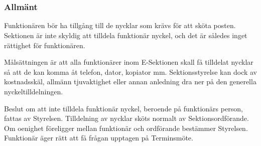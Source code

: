 \documentclass[10pt]{article}
\begin{document}
\section*{\doctitle}

\subsubsection*{Allmänt}

Funktionären bör ha tillgång till de nycklar som krävs för att sköta posten. Sektionen är inte skyldig att tilldela funktionär nyckel, och det är således inget rättighet för funktionären.

Målsättningen är att alla funktionärer inom E-Sektionen skall få tilldelat nycklar så att de kan komma åt telefon, dator, kopiator mm. Sektionsstyrelse kan dock av kostnadsskäl, allmänn tjuvaktighet eller annan anledning dra ner på den generella nyckeltilldelningen.

Beslut om att inte tilldela funktionär nyckel, beroende på funktionärs person, fattas av Styrelsen. Tilldelning av nycklar sköts normalt av Sektionsordförande. Om oenighet föreligger mellan funktionär och ordförande bestämmer Styrelsen. Funktionär äger rätt att få frågan upptagen på Terminsmöte.
\end{document}
